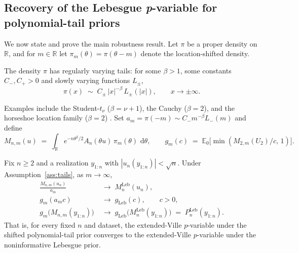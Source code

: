 \documentclass[12pt, a4paper]{report}
\newcommand{\E}{\mathbb{E}}
\newcommand{\dd}{\,\mathrm{d}}
\newcommand{\Leb}{\mathrm{Leb}}
\newcommand{\1}{\mathbf{1}}
\begin{document}
\subsection{Recovery of the Lebesgue \textit{p}-variable for polynomial-tail priors}
\label{sec:recovery}

We now state and prove the main robustness result. Let \(\pi\) be a
proper density on \(\mathbb{R}\), and for \(m\in\mathbb{R}\) let
\(\pi_m(\theta)=\pi(\theta-m)\) denote the location-shifted density.

\begin{assumption}\label{ass:tails}
The density \(\pi\) has regularly varying tails: for some \(\beta>1\), some constants \(C_-,C_+>0\) and slowly varying functions \(L_\pm\),
\begin{equation}\label{eq:tails}
   \pi(x)\;\sim\; C_\pm\,|x|^{-\beta}\,L_\pm(|x|),\qquad x\to\pm\infty.
\end{equation}
\end{assumption}

Examples include the Student-\(t_\nu\) (\(\beta=\nu+1\)), the Cauchy
(\(\beta=2\)), and the horseshoe location family (\(\beta=2\))
\citep{Carvalho2010}. Set
\(a_m =\pi(-m)\sim C_-m^{-\beta}L_-(m)\) and define
\begin{equation}\label{eq:Mnm-def}
  M_{n,m}(u)\;=\;\int_\mathbb{R} e^{-n\theta^2/2}A_n(\theta u)\,\pi_m(\theta)
  \,\dd\theta,
  \qquad
  g_m(c)\;=\;\E_0\!\bigl[\min(M_{2,m}(U_2)/c,\,1)\bigr].
\end{equation}

\begin{theorem}\label{thm:recovery}
Fix \(n\geq 2\) and a realization \(y_{1:n}\) with
\(|u_n(y_{1:n})|<\sqrt n\). Under
Assumption~\ref{ass:tails}, as \(m\to\infty\),
\begin{align}
  \frac{M_{n,m}(u_n)}{a_m}
   &\;\longrightarrow\; M_n^{\Leb}(u_n),
   \label{eq:Mnm-asymp}\\
  g_m(a_m c)
   &\;\longrightarrow\; g_{\Leb}(c),\qquad c>0,
   \label{eq:gm-asymp}\\
  g_m\!\bigl(M_{n,m}(y_{1:n})\bigr)
   &\;\longrightarrow\;
   g_{\Leb}\!\bigl(M_n^{\Leb}(y_{1:n})\bigr)
   \;=\;P_n^{\Leb}(y_{1:n}).
   \label{eq:p-asymp}
\end{align}
That is, for every fixed \(n\) and dataset, the extended-Ville $p$-variable under the shifted polynomial-tail prior converges to the extended-Ville $p$-variable under the noninformative Lebesgue prior.
\end{theorem}
\end{document}
